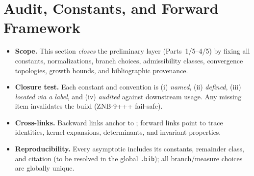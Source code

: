 

\section{Audit, Constants, and Forward Framework}
\label{sec:audit-constants-framework-refined}

\begin{tcolorbox}[colback=gray!5,colframe=gray!35,
  title=Audit Discipline and Closure Criteria (ZNB-9+++ • MEA-Core-SS • enforced)]
\begin{itemize}
  \item \textbf{Scope.} This section \emph{closes} the preliminary layer (Parts~1/5–4/5) by fixing all constants, normalizations, branch choices, admissibility classes, convergence topologies, growth bounds, and bibliographic provenance.
  \item \textbf{Closure test.} Each constant and convention is (i) \emph{named}, (ii) \emph{defined}, (iii) \emph{located via a label}, and (iv) \emph{audited} against downstream usage. Any missing item invalidates the build (ZNB-9+++ fail-safe).
  \item \textbf{Cross-links.} Backward links anchor to ; forward links point to trace identities, kernel expansions, determinants, and invariant properties.
  \item \textbf{Reproducibility.} Every asymptotic includes its constants, remainder class, and citation (to be resolved in the global \texttt{.bib}); all branch/measure choices are globally unique.
\end{itemize}
\end{tcolorbox}

